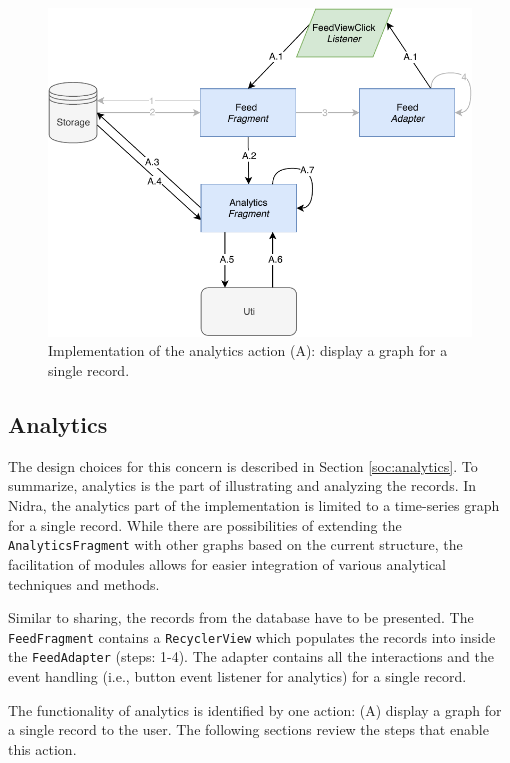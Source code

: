 \begin{figure}
    \centering
    \includegraphics[scale=0.7]{images/Anal_Imp.pdf}
    \caption{Implementation of the analytics action (A): display a graph for a single record.}
    \label{fig:impl_analytics}
\end{figure}

\subsection{Analytics}\label{ioc:analytics}
The design choices for this concern is described in Section \ref{soc:analytics}. To summarize, analytics is the part of illustrating and analyzing the records. In Nidra, the analytics part of the implementation is limited to a time-series graph for a single record. While there are possibilities of extending the \verb|AnalyticsFragment| with other graphs based on the current structure, the facilitation of modules allows for easier integration of various analytical techniques and methods.

Similar to sharing, the records from the database have to be presented. The \verb|FeedFragment| contains a \verb|RecyclerView| which populates the records into inside the \verb|FeedAdapter| (steps: 1-4). The adapter contains all the interactions and the event handling (i.e., button event listener for analytics) for a single record. 

The functionality of analytics is identified by one action: (A) display a graph for a single record to the user. The following sections review the steps that enable this action. 

